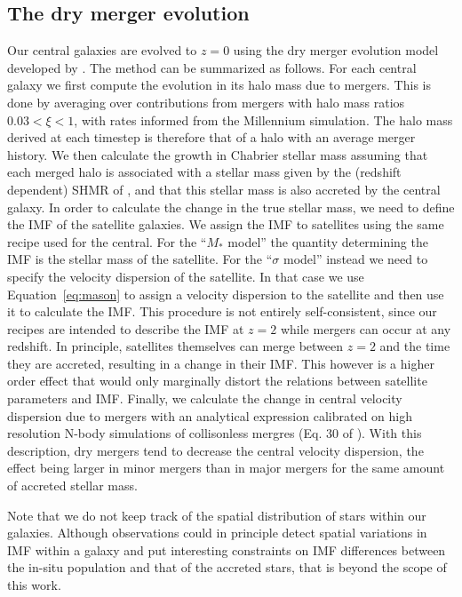\documentclass[usenatbib, letters]{mnras}
\def\Eref#1{Equation~\ref{#1}\xspace}
\begin{document}
\subsection{The dry merger evolution}

Our central galaxies are evolved to $z=0$ using the dry merger evolution model developed by \citet{Nip++12}.
The method can be summarized as follows.
For each central galaxy we first compute the evolution in its halo mass due to mergers.
This is done by averaging over contributions from mergers with halo mass ratios $0.03 < \xi < 1$, with rates informed from the Millennium simulation.
The halo mass derived at each timestep is therefore that of a halo with an average merger history.
We then calculate the growth in Chabrier stellar mass assuming that each merged halo is associated with a stellar mass given by the (redshift dependent) SHMR of \citet{Lea++12}, and that this stellar mass is also accreted by the central galaxy.
In order to calculate the change in the true stellar mass, we need to define the IMF of the satellite galaxies. We assign the IMF to satellites using the same recipe used for the central. For the ``$M_*$ model'' the quantity determining the IMF is the stellar mass of the satellite. For the ``$\sigma$ model'' instead we need to specify the velocity dispersion of the satellite. In that case we use \Eref{eq:mason} to assign a velocity dispersion to the satellite and then use it to calculate the IMF.
This procedure is not entirely self-consistent, since our recipes are intended to describe the IMF at $z=2$ while mergers can occur at any redshift. In principle, satellites themselves can merge between $z=2$ and the time they are accreted, resulting in a change in their IMF. This however is a higher order effect that would only marginally distort the relations between satellite parameters and IMF. 
Finally, we calculate the change in central velocity dispersion due to mergers with an analytical expression calibrated on high resolution N-body simulations of collisonless mergres (Eq. 30 of \citet{Nip++12}). 
With this description, dry mergers tend to decrease the central velocity dispersion, the effect being larger in minor mergers than in major mergers for the same amount of accreted stellar mass.

Note that we do not keep track of the spatial distribution of stars within our galaxies. Although observations could in principle detect spatial variations in IMF within a galaxy and put interesting constraints on IMF differences between the in-situ population and that of the accreted stars, that is beyond the scope of this work.
\end{document}
